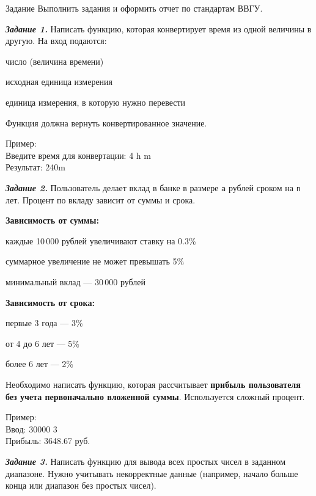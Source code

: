 \documentclass[]{vvsu}
\begin{document}
\begin{addition}{Задание}
  Выполнить задания и оформить отчет по стандартам ВВГУ.

   \textit{\textbf{Задание 1.}}  
  Написать функцию, которая конвертирует время из одной величины в другую.  
  На вход подаются:  
  \begin{vvsu_itemize}
    \item число (величина времени)
    \item исходная единица измерения
    \item единица измерения, в которую нужно перевести
  \end{vvsu_itemize}
  Функция должна вернуть конвертированное значение.

  Пример:\\
    Введите время для конвертации: 4 h m\\
    Результат: 240m

  \textit{\textbf{Задание 2.}}  
  Пользователь делает вклад в банке в размере \texttt{a} рублей сроком на \texttt{n} лет. Процент по вкладу зависит от суммы и срока.

  \textbf{Зависимость от суммы:}
  \begin{vvsu_itemize}
    \item каждые 10\,000 рублей увеличивают ставку на 0.3\%
    \item суммарное увеличение не может превышать 5\%
    \item минимальный вклад — 30\,000 рублей
  \end{vvsu_itemize}

  \textbf{Зависимость от срока:}
  \begin{vvsu_itemize}
    \item первые 3 года — 3\%
    \item от 4 до 6 лет — 5\%
    \item более 6 лет — 2\%
  \end{vvsu_itemize}

  Необходимо написать функцию, которая рассчитывает \textbf{прибыль пользователя без учета первоначально вложенной суммы}. Используется сложный процент.

  Пример:\\
    Ввод: 30000 3\\
    Прибыль: 3648.67 руб.

  \textit{\textbf{Задание 3.}}  
  Написать функцию для вывода всех простых чисел в заданном диапазоне. Нужно учитывать некорректные данные (например, начало больше конца или диапазон без простых чисел).


\end{addition}
\end{document}
